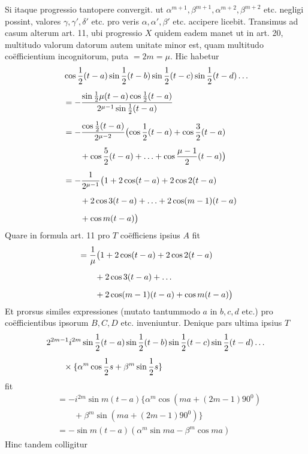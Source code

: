 Si itaque progressio tantopere convergit. ut \(\alpha^{m+1},\beta^{m+1},\alpha^{m+2},\beta^{m+2}\) etc. negligi
possint, valores \(\gamma,\gamma',\delta'\) etc. pro veris \(\alpha,\alpha',\beta'\) etc. accipere licebit.
Transimus ad casum alterum art. 11, ubi progressio \(X\) quidem eadem manet ut in art. 20, multitudo valorum datorum autem unitate minor est, quam
multitudo co\"efficientium incognitorum, puta \(=2m=\mu\). Hic habetur
\[
\begin{aligned}
&\cos\frac12(t-a)\sin\frac12(t-b)\sin\frac12(t-c)\sin\frac12(t-d)\mathinner{.\,.\,.}\\[5pt]
&=-\frac{\sin\frac12\mu(t-a)\cos\frac12(t-a)}{2^{\mu-1}\sin\frac12(t-a)}\\[5pt]
&=-\frac{\cos\frac12(t-a)}{2^{\mu-2}}\bigl(\cos\frac12(t-a)+\cos\frac32(t-a)\\[5pt]&\qquad{}+\cos\frac52(t-a)+\mathinner{.\,.\,.}+\cos\frac{\mu-1}{2}(t-a)\bigr)\\[5pt]
&=-\frac{1}{2^{\mu-1}}\bigl(1+2\cos(t-a)+2\cos2(t-a)\\[5pt]&\qquad{}+2\cos3(t-a)+\mathinner{.\,.\,.}+2\cos(m-1)(t-a)\\[5pt]
&\qquad +\cos m(t-a)\bigr)
\end{aligned}
\]
Quare in formula art. 11 pro $T$ co\"efficiens ipsius $A$ fit
\[
\begin{aligned}
&=\frac1\mu\bigl(1+2\cos(t-a)+2\cos2(t-a)\\[5pt]&\qquad{}+2\cos3(t-a)+\mathinner{.\,.\,.}\\[5pt]
&\qquad +2\cos(m-1)(t-a)+\cos m(t-a)\bigr)
\end{aligned}
\]
Et prorsus similes expressiones (mutato tantummodo $a$ in $b,c,d$ etc.) pro co\"efficientibus ipsorum $B,C,D$ etc. inveniuntur. Denique pars ultima ipsius $T$
\[
\begin{aligned}
&2^{2m-1}i^{2m}\sin\frac12(t-a)\sin\frac12(t-b)\sin\frac12(t-c)\sin\frac12(t-d)\mathinner{.\,.\,.}\\[5pt]&\qquad\times\{\alpha^m\cos\frac12s+\beta^m\sin\frac12s\}
\end{aligned}
\]
fit
\[
\begin{aligned}
&=-i^{2m}\sin m(t-a)\{\alpha^m\cos(ma+(2m-1)90^{0})\\[5pt]&\qquad{}+\beta^m\sin(ma+(2m-1)90^{0})\}\\[5pt]
&=-\sin m(t-a)(\alpha^m\sin ma-\beta^m\cos ma)
\end{aligned}
\]
Hinc tandem colligitur
